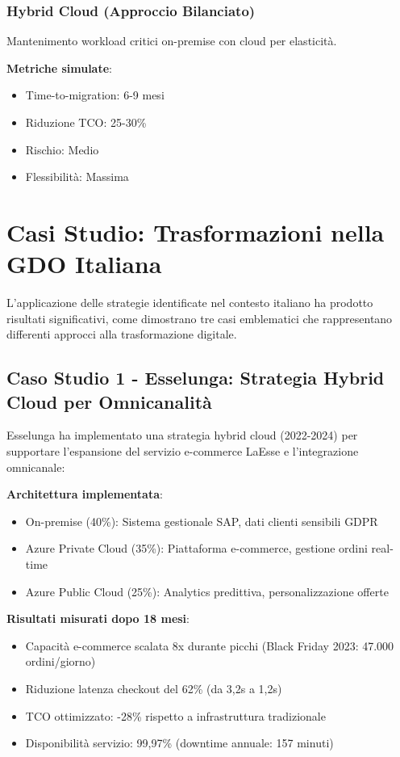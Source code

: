 \subsubsection{Hybrid Cloud (Approccio Bilanciato)}
Mantenimento workload critici on-premise con cloud per elasticità.

\textbf{Metriche simulate}:
\begin{itemize}
\item Time-to-migration: 6-9 mesi
\item Riduzione TCO: 25-30\%
\item Rischio: Medio
\item Flessibilità: Massima
\end{itemize}

\section{Casi Studio: Trasformazioni nella GDO Italiana}

L'applicazione delle strategie identificate nel contesto italiano ha prodotto risultati significativi, come dimostrano tre casi emblematici che rappresentano differenti approcci alla trasformazione digitale.

\subsection{Caso Studio 1 - Esselunga: Strategia Hybrid Cloud per Omnicanalità}

Esselunga ha implementato una strategia hybrid cloud (2022-2024) per supportare l'espansione del servizio e-commerce LaEsse e l'integrazione omnicanale:

\textbf{Architettura implementata}:
\begin{itemize}
\item On-premise (40\%): Sistema gestionale SAP, dati clienti sensibili GDPR
\item Azure Private Cloud (35\%): Piattaforma e-commerce, gestione ordini real-time
\item Azure Public Cloud (25\%): Analytics predittiva, personalizzazione offerte
\end{itemize}

\textbf{Risultati misurati dopo 18 mesi}:
\begin{itemize}
\item Capacità e-commerce scalata 8x durante picchi (Black Friday 2023: 47.000 ordini/giorno)
\item Riduzione latenza checkout del 62\% (da 3,2s a 1,2s)
\item TCO ottimizzato: -28\% rispetto a infrastruttura tradizionale
\item Disponibilità servizio: 99,97\% (downtime annuale: 157 minuti)
\end{itemize}

